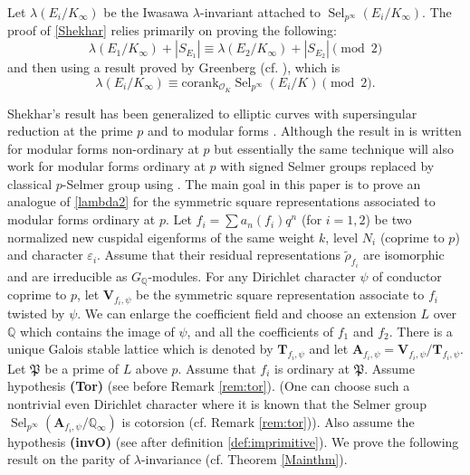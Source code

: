\documentclass{amsart}
\newcommand{\Q}{\mathbb{Q}}
\newcommand{\bV}{\mathbf{V}}
\newcommand{\bT}{\mathbf{T}}
\newcommand{\bA}{\mathbf{A}}
\newcommand{\Sel}{\operatorname{Sel}}
\renewcommand{\O}{\mathcal{O}}
\newtheorem{auxiliary proposition}[theorem]{Auxiliary Proposition}
\newtheorem{main conjecture}[theorem]{Main Conjecture}
\newtheorem{main theorem}[theorem]{Main Theorem}
\newtheorem{modesty proposition}[theorem]{Modesty Proposition}
\newtheorem{open problem}[theorem]{Open Problem}
\newtheorem{convergence lemma}[theorem]{Convergence Lemma}
\newtheorem{corrected lemma}[theorem]{Corrected Lemma}
\newtheorem{growth lemma}[theorem]{Growth Lemma}
\newtheorem{coefficient lemma}[theorem]{Integrality Lemma}
\newtheorem{interpolation lemma}[theorem]{Interpolation Lemma}
\newtheorem{kernel lemma}[theorem]{Kernel Lemma}
\newtheorem{limit lemma}[theorem]{Limit Lemma}
\newtheorem{tandem lemma}[theorem]{Modesty Lemma}
\newtheorem{zero-finding lemma}[theorem]{Zero-Finding Lemma}
\begin{document}
Let $\lambda(E_i/K_\infty)$ be the Iwasawa $\lambda$-invariant attached to $\Sel_{p^\infty}(E_i/K_\infty)$. The proof of \eqref{Shekhar} relies primarily on proving the following:
\begin{equation}\label{lambda2} \lambda(E_1/K_\infty)+|S_{E_1}| \equiv \lambda(E_2/K_\infty)+|S_{E_2}| \pmod{2}   
\end{equation}
and then using a result proved by Greenberg (cf. \cite[Prop. 3.10]{Greenberg}), which is 
\begin{equation}\label{Green}
  \lambda(E_i/K_\infty) \equiv \mathrm{corank}_{\O_K}\Sel_{p^\infty}(E_i/K) \pmod{2}.  
\end{equation}




Shekhar's result has been generalized to elliptic curves with supersingular reduction at the prime $p$ \cite{Hatley17} and  to modular forms \cite[Theorem 5.7]{HatleyLei19}. Although the result in \cite{HatleyLei19} is written for modular forms non-ordinary at $p$ but essentially the same technique will also work for modular forms ordinary at $p$ with signed Selmer groups replaced by classical $p$-Selmer group using \cite[Theorem 4.3.4 (ii)]{EmertonPollackWeston}. The main goal in this paper is to prove an analogue of \eqref{lambda2} for the symmetric square representations associated to modular forms ordinary at $p$. 
Let $f_i=\sum a_n(f_i)q^n$ (for $i=1,2$) be two normalized new cuspidal eigenforms of the same weight $k$, level $N_i$ (coprime to $p$) and character $\varepsilon_i$. Assume that  their residual representations $\tilde{\rho}_{f_i}$ are isomorphic and are irreducible as $G_\Q$-modules. For any Dirichlet character $\psi$ of conductor coprime to $p$, let $\bV_{f_i,\psi}$ be the symmetric square representation associate to $f_i$ twisted by $\psi$. We can enlarge the coefficient field and choose an extension $L$ over $\Q$ which contains the image of $\psi$, and all the coefficients of $f_1$ and $f_2$.  There is a unique Galois stable lattice which is denoted by $\bT_{f_i,\psi}$ and let $\bA_{f_i,\psi}=\bV_{f_i,\psi}/\bT_{f_i,\psi}.$ Let $\mathfrak{P}$ be a prime of $L$ above $p$. Assume that $f_i$ is ordinary at $\mathfrak{P}$. Assume hypothesis \textbf{(Tor)} (see before Remark \ref{rem:tor}). (One can choose such a nontrivial even Dirichlet character  where it is known that the Selmer group $\Sel_{p^\infty}(\bA_{f_i,\psi}/\Q_\infty)$ is cotorsion (cf. Remark \ref{rem:tor})). 
  Also assume the hypothesis \textbf{(invO)} (see after definition \ref{def:imprimitive}). We prove the following result on the parity of $\lambda$-invariance (cf. Theorem \ref{Mainthm}).
\end{document}
